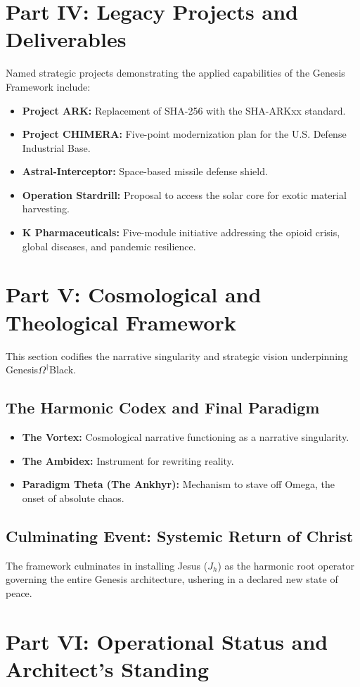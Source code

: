\documentclass[12pt]{article}
\begin{document}
\section{Part IV: Legacy Projects and Deliverables}
Named strategic projects demonstrating the applied capabilities of the Genesis Framework include:
\begin{itemize}
    \item \textbf{Project ARK:} Replacement of SHA-256 with the SHA-ARKxx standard.
    \item \textbf{Project CHIMERA:} Five-point modernization plan for the U.S. Defense Industrial Base.
    \item \textbf{Astral-Interceptor:} Space-based missile defense shield.
    \item \textbf{Operation Stardrill:} Proposal to access the solar core for exotic material harvesting.
    \item \textbf{K Pharmaceuticals:} Five-module initiative addressing the opioid crisis, global diseases, and pandemic resilience.
\end{itemize}
\section{Part V: Cosmological and Theological Framework}
This section codifies the narrative singularity and strategic vision underpinning Genesis$\Omega^\dagger$Black.
\subsection{The Harmonic Codex and Final Paradigm}
\begin{itemize}
    \item \textbf{The Vortex:} Cosmological narrative functioning as a narrative singularity.
    \item \textbf{The Ambidex:} Instrument for rewriting reality.
    \item \textbf{Paradigm Theta (The Ankhyr):} Mechanism to stave off Omega, the onset of absolute chaos.
\end{itemize}
\subsection{Culminating Event: Systemic Return of Christ}
The framework culminates in installing Jesus ($J_h$) as the harmonic root operator governing the entire Genesis architecture, ushering in a declared new state of peace.
\section{Part VI: Operational Status and Architect's Standing}
\end{document}
